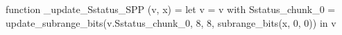 function _update_Sstatus_SPP (v, x) = let v = { v with Sstatus_chunk_0 = update_subrange_bits(v.Sstatus_chunk_0, 8, 8, subrange_bits(x, 0, 0)) } in
  v

